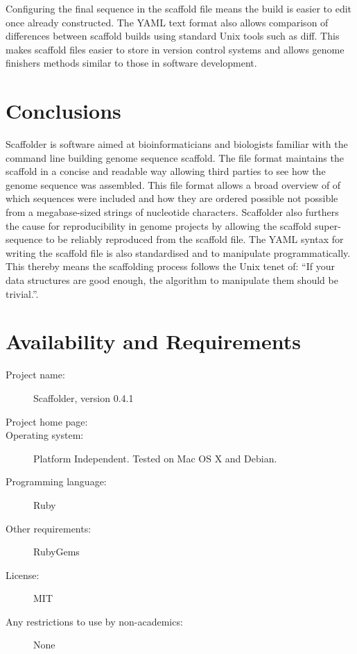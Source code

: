 \documentclass[10pt]{bmc_article}
\newenvironment{bmcformat}{\begin{raggedright}\baselineskip20pt\sloppy\setboolean{publ}{false}}{\end{raggedright}\baselineskip20pt\sloppy}
\begin{document}
\begin{bmcformat}
Configuring the final sequence in the scaffold file means the build is easier
to edit once already constructed. The YAML text format also allows comparison
of differences between scaffold builds using standard Unix tools such as diff.
This makes scaffold files easier to store in version control systems and allows
genome finishers methods similar to those in software development. \pb 

\clearpage

\section*{Conclusions} %

Scaffolder is software aimed at bioinformaticians and biologists familiar with
the command line building genome sequence scaffold. The file format maintains
the scaffold in a concise and readable way allowing third parties to see how
the genome sequence was assembled. This file format allows a broad overview of
of which sequences were included and how they are ordered possible not possible
from a megabase-sized strings of nucleotide characters. Scaffolder also
furthers the cause for reproducibility in genome projects by allowing the
scaffold super-sequence to be reliably reproduced from the scaffold file. The
YAML syntax for writing the scaffold file is also standardised and to
manipulate programmatically. This thereby means the scaffolding process follows
the Unix tenet of: ``If your data structures are good enough, the algorithm to
manipulate them should be trivial.''.

\clearpage

\section*{Availability and Requirements} %

  \begin{description}
    \item[Project name:] Scaffolder, version 0.4.1
    \item[Project home page:] \scaffolder
    \item[Operating system:] Platform Independent. Tested on Mac OS X and
    Debian.
    \item[Programming language:] Ruby
    \item[Other requirements:] RubyGems
    \item[License:] MIT
    \item[Any restrictions to use by non-academics:] None
  \end{description}


\end{bmcformat}
\end{document}
